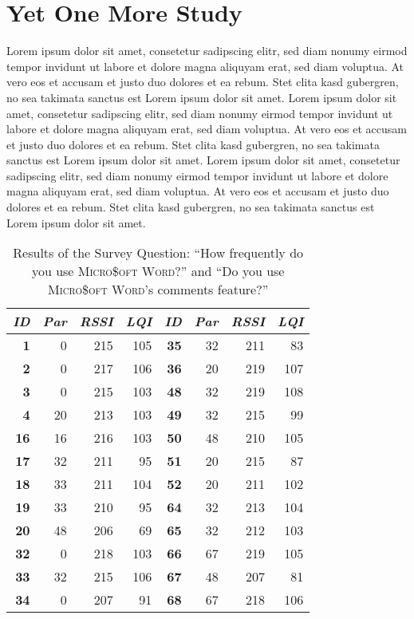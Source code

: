 \section{Yet One More Study}
Lorem ipsum dolor sit amet, consetetur sadipscing elitr,  sed diam nonumy eirmod
tempor invidunt ut labore et dolore magna aliquyam erat, sed diam voluptua. At
vero eos et accusam et justo duo dolores et ea rebum. Stet clita kasd gubergren,
no sea takimata sanctus est Lorem ipsum dolor sit amet. Lorem ipsum dolor sit
amet, consetetur sadipscing elitr,  sed diam nonumy eirmod tempor invidunt ut
labore et dolore magna aliquyam erat, sed diam voluptua. At vero eos et accusam
et justo duo dolores et ea rebum. Stet clita kasd gubergren, no sea takimata
sanctus est Lorem ipsum dolor sit amet. Lorem ipsum dolor sit amet, consetetur
sadipscing elitr,  sed diam nonumy eirmod tempor invidunt ut labore et dolore
magna aliquyam erat, sed diam voluptua. At vero eos et accusam et justo duo
dolores et ea rebum. Stet clita kasd gubergren, no sea takimata sanctus est
Lorem ipsum dolor sit amet.

\begin{table}
\begin{center}
\begin{tabular}{|r|r|r|r||r|r|r|r|}
\hline \textbf{\textit{ID}} & \textbf{\textit{Par}} & \textbf{\textit{RSSI}} &
\textbf{\textit{LQI}} &
\textbf{\textit{ID}} & \textbf{\textit{Par}} & \textbf{\textit{RSSI}} & \textbf{\textit{LQI}} \\
\hline \hline
\textbf{1}  &  0 & 215 & 105 & \textbf{35} & 32 & 211 &  83 \\
\textbf{2}  &  0 & 217 & 106 & \textbf{36} & 20 & 219 & 107 \\
\textbf{3}  &  0 & 215 & 103 & \textbf{48} & 32 & 219 & 108 \\
\textbf{4}  & 20 & 213 & 103 & \textbf{49} & 32 & 215 &  99 \\
\textbf{16} & 16 & 216 & 103 & \textbf{50} & 48 & 210 & 105 \\
\textbf{17} & 32 & 211 &  95 & \textbf{51} & 20 & 215 &  87 \\
\textbf{18} & 33 & 211 & 104 & \textbf{52} & 20 & 211 & 102 \\
\textbf{19} & 33 & 210 &  95 & \textbf{64} & 32 & 213 & 104 \\
\textbf{20} & 48 & 206 &  69 & \textbf{65} & 32 & 212 & 103 \\
\textbf{32} &  0 & 218 & 103 & \textbf{66} & 67 & 219 & 105 \\
\textbf{33} & 32 & 215 & 106 & \textbf{67} & 48 & 207 &  81 \\
\textbf{34} &  0 & 207 &  91 & \textbf{68} & 67 & 218 & 106 \\
\hline
\end{tabular}
\caption[Results of the Survey Question: ``How frequently do you use \textsc{Micro\$oft \newline Word}?'' and ``Do you use \textsc{Micro\$oft Word}'s comments feature?'']{Results of the Survey Question: ``How frequently do you use \textsc{Micro\$oft Word}?'' and ``Do you use \textsc{Micro\$oft Word}'s comments feature?''}
\end{center}
\end{table}

